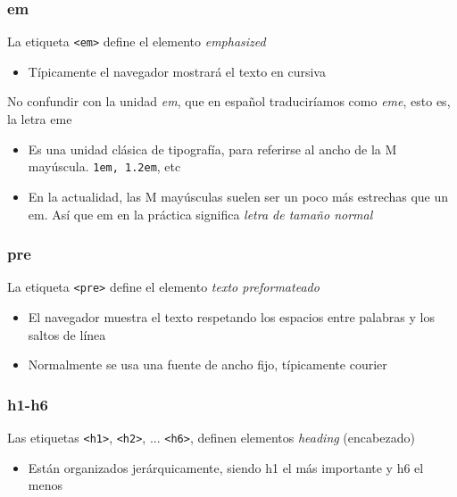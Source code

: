 \documentclass[ucs]{beamer}
\begin{document}
\begin{frame}[fragile]
\frametitle{em}
La etiqueta \verb|<em>| define el elemento \emph{emphasized}

\begin{itemize}
\item
Típicamente el navegador mostrará el texto en cursiva
\end{itemize}


No confundir con la unidad
\emph{em},
que en español traduciríamos como
\emph{eme},
esto es, la letra eme

    \begin{itemize}
    \item
 Es una unidad clásica de tipografía, para referirse al ancho de la M mayúscula. \verb|1em, 1.2em|, etc
    \item
En la actualidad, las M mayúsculas suelen ser un poco más
estrechas que un em.  Así que em en la práctica significa \emph{letra de tamaño normal}
    \end{itemize}



\end{frame}






\begin{frame}[fragile]
\frametitle{pre}
La etiqueta \verb|<pre>| define el elemento \emph{texto preformateado}
\begin{itemize}
\item
El navegador muestra el texto respetando los espacios entre palabras y los saltos
de línea

\item
Normalmente se usa una fuente de ancho fijo, típicamente
courier

\end{itemize}

\end{frame}


\begin{frame}[fragile]
\frametitle{h1-h6}
Las etiquetas 
\verb|<h1>|, 
\verb|<h2>|, 
...
\verb|<h6>|, 
definen elementos 
\emph{heading}
(encabezado)
\begin{itemize}
\item
Están organizados jerárquicamente, siendo h1 el más importante y h6 el menos
\end{itemize}

\end{frame}
\end{document}
